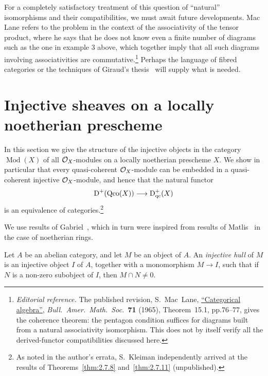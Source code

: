 For a completely satisfactory treatment of this question of ``natural'' isomorphisms and their compatibilities, we must await future developments. Mac Lane \cite[pp.~14,15]{12} refers to the problem in the context of the associativity of the tensor product, where he says that he does not know even a finite number of diagrams such as the one in example 3 above, which together imply that all such diagrams involving associativities are commutative.\footnote{\emph{Editorial reference.} The published revision, S.~Mac~Lane, \href{https://doi.org/10.1090/S0002-9904-1965-11234-4}{``Categorical algebra''}, \emph{Bull.\ Amer.\ Math.\ Soc.}\ \textbf{71} (1965), Theorem~15.1, pp.76--77, gives the coherence theorem: the pentagon condition suffices for diagrams built from a natural associativity isomorphism. This does not by itself verify all the derived-functor compatibilities discussed here.} Perhaps the language of fibred categories \cite[--61, expos\'e~VI]{SGA} or the techniques of Giraud's thesis~\cite{6} will supply what is needed.

\section[Injective sheaves on a locally noetherian prescheme]{Injective sheaves on a locally\\noetherian prescheme}\label{sec:2.7}

In this section we give the structure of the injective objects in the category $\operatorname{Mod}(X)$ of all $\mathcal{O}_X$-modules on a locally noetherian prescheme $X$. We show in particular that every quasi-coherent $\mathcal{O}_X$-module can be embedded in a quasi-coherent injective $\mathcal{O}_X$-module, and hence that the natural functor
\[
\operatorname{D}^+(\operatorname{Qco}(X)) \longrightarrow \operatorname{D}_{\mathrm{qc}}^+(X)
\]
is an equivalence of categories.\footnote{As noted in the author's errata, S.~Kleiman independently arrived at the results of Theorems~\ref{thm:2.7.8} and~\ref{thm:2.7.11} (unpublished).}

We use results of Gabriel~\cite{5}, which in turn were inspired from results of Matlis~\cite{13} in the case of noetherian rings.

\begin{definition*}
Let $A$ be an abelian category, and let $M$ be an object of $A$. An \emph{injective hull} of $M$ is an injective object $I$ of $A$, together with a monomorphism $M\to I$, such that if $N$ is a non-zero subobject of $I$, then $M\cap N\neq 0$.
\end{definition*}

